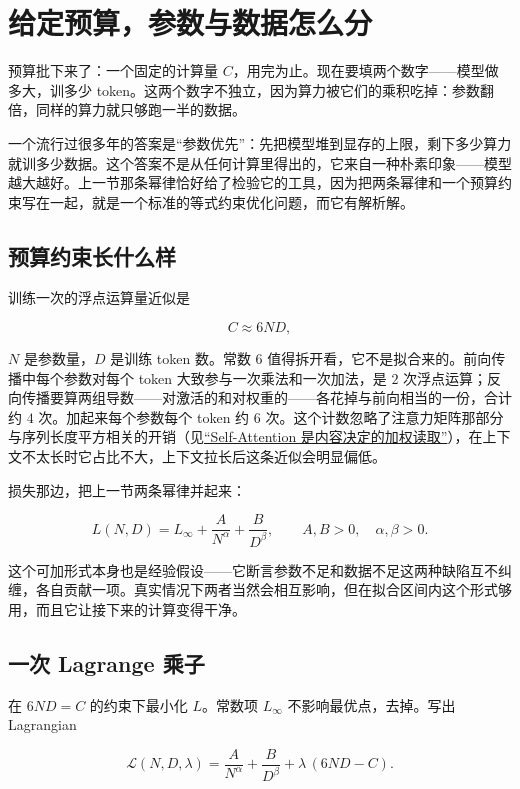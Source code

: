 \section{给定预算，参数与数据怎么分}
\label{sec:14-Deep-Learning/09-Scaling-and-Adaptation/02}

预算批下来了：一个固定的计算量 \(C\)，用完为止。现在要填两个数字——模型做多大，训多少 token。这两个数字不独立，因为算力被它们的乘积吃掉：参数翻倍，同样的算力就只够跑一半的数据。

一个流行过很多年的答案是``参数优先''：先把模型堆到显存的上限，剩下多少算力就训多少数据。这个答案不是从任何计算里得出的，它来自一种朴素印象——模型越大越好。上一节那条幂律恰好给了检验它的工具，因为把两条幂律和一个预算约束写在一起，就是一个标准的等式约束优化问题，而它有解析解。

\subsection{预算约束长什么样}

训练一次的浮点运算量近似是

\[
  C \approx 6 N D,
\]

\(N\) 是参数量，\(D\) 是训练 token 数。常数 \(6\) 值得拆开看，它不是拟合来的。前向传播中每个参数对每个 token 大致参与一次乘法和一次加法，是 \(2\) 次浮点运算；反向传播要算两组导数——对激活的和对权重的——各花掉与前向相当的一份，合计约 \(4\) 次。加起来每个参数每个 token 约 \(6\) 次。这个计数忽略了注意力矩阵那部分与序列长度平方相关的开销（见\hyperref[sec:14-Deep-Learning/05-Attention-and-Sequence-Models/01]{``Self-Attention 是内容决定的加权读取''}），在上下文不太长时它占比不大，上下文拉长后这条近似会明显偏低。

损失那边，把上一节两条幂律并起来：

\[
  L(N, D) = L_\infty + \frac{A}{N^{\alpha}} + \frac{B}{D^{\beta}},
  \qquad A, B > 0,\quad \alpha, \beta > 0 .
\]

这个可加形式本身也是经验假设——它断言参数不足和数据不足这两种缺陷互不纠缠，各自贡献一项。真实情况下两者当然会相互影响，但在拟合区间内这个形式够用，而且它让接下来的计算变得干净。

\subsection{一次 Lagrange 乘子}

在 \(6ND = C\) 的约束下最小化 \(L\)。常数项 \(L_\infty\) 不影响最优点，去掉。写出 Lagrangian

\[
  \mathcal{L}(N, D, \lambda) = \frac{A}{N^{\alpha}} + \frac{B}{D^{\beta}} + \lambda\,(6ND - C).
\]

